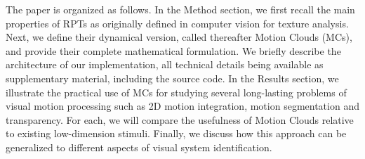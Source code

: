 \documentclass[a4paper,11pt]{article}%
\begin{document}
The paper is organized as follows. In the Method section, we first recall the main properties of  RPTs as originally defined in computer vision for texture analysis. Next, we define their dynamical version, called thereafter Motion Clouds (MCs), and provide their complete mathematical formulation. We briefly describe the architecture of our implementation, all technical details being available as supplementary material, including the source code. In the Results section, we illustrate the practical use of MCs for studying several long-lasting problems of visual motion processing such as 2D motion integration, motion segmentation and transparency. For each, we will compare the usefulness of Motion Clouds relative to existing low-dimension stimuli. Finally, we discuss how this approach can be generalized to different aspects of visual system identification. %
\end{document}
